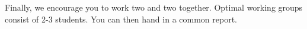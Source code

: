 \documentclass[%
oneside,                 %
final,                   %
10pt]{article}
\begin{document}
\noindent
Finally, 
we encourage you to work two and two together. Optimal working groups consist of 
2-3 students. You can then hand in a common report. 












\end{document}
